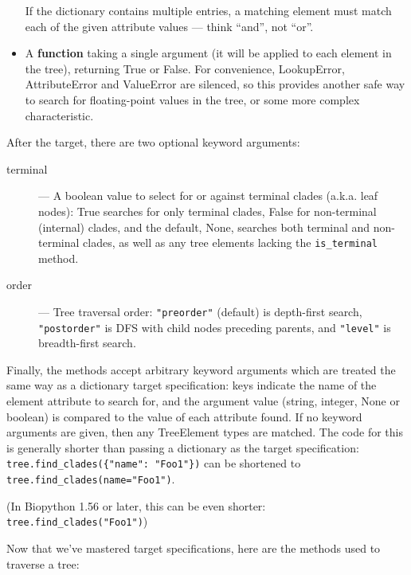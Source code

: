 \documentclass{report}
\begin{document}
\begin{itemize}
    If the dictionary contains multiple entries, a matching element must match each of the
    given attribute values --- think ``and'', not ``or''.

  \item A \textbf{function} taking a single argument (it will be applied to each element in the
    tree), returning True or False. For convenience, LookupError, AttributeError and ValueError
    are silenced, so this provides another safe way to search for floating-point values in the
    tree, or some more complex characteristic.

\end{itemize}

After the target, there are two optional keyword arguments:

\begin{description}
  \item[terminal] --- A boolean value to select for or against terminal clades (a.k.a. leaf
    nodes): True searches for only terminal clades, False for non-terminal (internal) clades,
    and the default, None, searches both terminal and non-terminal clades, as well as any tree
    elements lacking the \verb|is_terminal| method.

  \item[order] --- Tree traversal order: \texttt{"preorder"} (default) is depth-first search,
    \texttt{"postorder"} is DFS with child nodes preceding parents, and \texttt{"level"} is
    breadth-first search.

\end{description}

Finally, the methods accept arbitrary keyword arguments which are treated the same way as a
dictionary target specification: keys indicate the name of the element attribute to search for,
and the argument value (string, integer, None or boolean) is compared to the value of each
attribute found. If no keyword arguments are given, then any TreeElement types are matched.
The code for this is generally shorter than passing a dictionary as the target specification:
\verb|tree.find_clades({"name": "Foo1"})| can be shortened to
\verb|tree.find_clades(name="Foo1")|.

(In Biopython 1.56 or later, this can be even shorter: \verb|tree.find_clades("Foo1")|)


Now that we've mastered target specifications, here are the methods used to traverse a tree:
\end{document}
